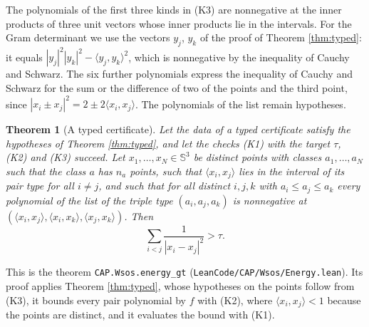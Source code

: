 \documentclass[reqno,a4paper,11pt]{amsart}
\numberwithin{equation}{section}
\newtheorem{theorem}{Theorem}[section]
\newcommand{\Sph}{\mathbb{S}}
\newcommand{\lean}[1]{\texttt{#1}}
\newcommand{\file}[1]{\nolinkurl{#1}}
\begin{document}
The polynomials of the first three kinds in (K3) are nonnegative at the inner products of three unit vectors whose inner products lie in the intervals. For the Gram determinant we use the vectors $y_j$, $y_k$ of the proof of Theorem \ref{thm:typed}: it equals $|y_j|^2 |y_k|^2 - \langle y_j, y_k \rangle^2$, which is nonnegative by the inequality of Cauchy and Schwarz. The six further polynomials express the inequality of Cauchy and Schwarz for the sum or the difference of two of the points and the third point, since $|x_i \pm x_j|^2 = 2 \pm 2 \langle x_i, x_j \rangle$. The polynomials of the list remain hypotheses.

\begin{theorem}[A typed certificate]\label{thm:cert}
Let the data of a typed certificate satisfy the hypotheses of Theorem \ref{thm:typed}, and let the checks \textup{(K1)} with the target $\tau$, \textup{(K2)} and \textup{(K3)} succeed. Let $x_1, \dots, x_N \in \Sph^3$ be distinct points with classes $a_1, \dots, a_N$ such that the class $a$ has $n_a$ points, such that $\langle x_i, x_j \rangle$ lies in the interval of its pair type for all $i \neq j$, and such that for all distinct $i, j, k$ with $a_i \leq a_j \leq a_k$ every polynomial of the list of the triple type $(a_i, a_j, a_k)$ is nonnegative at $(\langle x_i, x_j \rangle, \langle x_i, x_k \rangle, \langle x_j, x_k \rangle)$. Then
$$
\sum_{i<j} \frac{1}{|x_i - x_j|^2} > \tau .
$$
\end{theorem}

This is the theorem \lean{CAP.Wsos.energy\_gt} (\file{LeanCode/CAP/Wsos/Energy.lean}). Its proof applies Theorem \ref{thm:typed}, whose hypotheses on the points follow from (K3), it bounds every pair polynomial by $f$ with (K2), where $\langle x_i, x_j \rangle < 1$ because the points are distinct, and it evaluates the bound with (K1).
\end{document}
